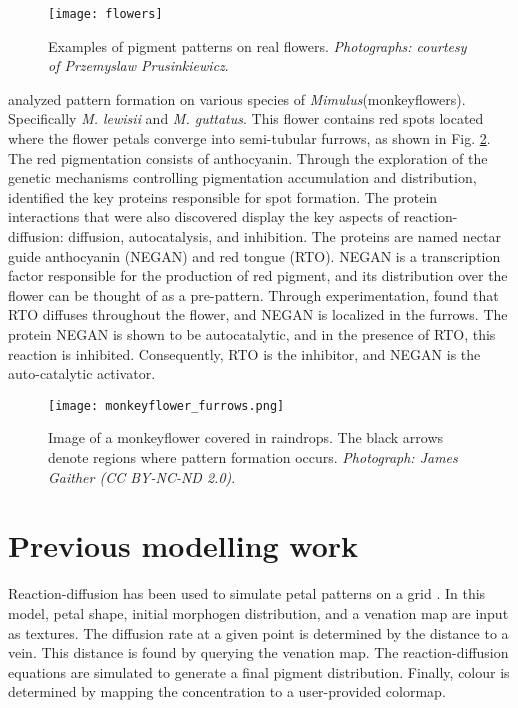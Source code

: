 \begin{figure}[!ht]
	\centering
	\texttt{[image: flowers]}
	\caption{Examples of pigment patterns on real flowers. \textit{Photographs: courtesy of Przemyslaw Prusinkiewicz}.}
	\label{fig:realFlowers}
\end{figure}

\citet{Yuan2019} analyzed pattern formation on various species of \textit{Mimulus}(monkeyflowers). Specifically \textit{M. lewisii} and \textit{M. guttatus}. This flower contains red spots located where the flower petals converge into semi-tubular furrows, as shown in Fig. \ref{fig:monkeyflower_real}. The red pigmentation consists of anthocyanin. Through the exploration of the genetic mechanisms controlling pigmentation accumulation and distribution, \citet{Yuan2019} identified the key proteins responsible for spot formation. The protein interactions that were also discovered display the key aspects of reaction-diffusion: diffusion, autocatalysis, and inhibition. The proteins are named nectar guide anthocyanin (NEGAN) and red tongue (RTO). NEGAN is a transcription factor responsible for the production of red pigment, and its distribution over the flower can be thought of as a pre-pattern. Through experimentation, \citet{Yuan2019} found that RTO diffuses throughout the flower, and NEGAN is localized in the furrows. The protein NEGAN is shown to be autocatalytic, and in the presence of RTO, this reaction is inhibited. Consequently, RTO is the inhibitor, and NEGAN is the auto-catalytic activator.

\begin{figure}[ht]
	\centering
	\texttt{[image: monkeyflower\_furrows.png]}
	\caption{Image of a monkeyflower covered in raindrops. The black arrows denote regions where pattern formation occurs. \textit{Photograph: James Gaither (CC BY-NC-ND 2.0)}.}
	\label{fig:monkeyflower_real}
\end{figure}

\section{Previous modelling work}
Reaction-diffusion has been used to simulate petal patterns on a grid \citep{zhou2007}. In this model, petal shape, initial morphogen distribution, and a venation map are input as textures. The diffusion rate at a given point is determined by the distance to a vein. This distance is found by querying the venation map. The reaction-diffusion equations are simulated to generate a final pigment distribution. Finally, colour is determined by mapping the concentration to a user-provided colormap. %

